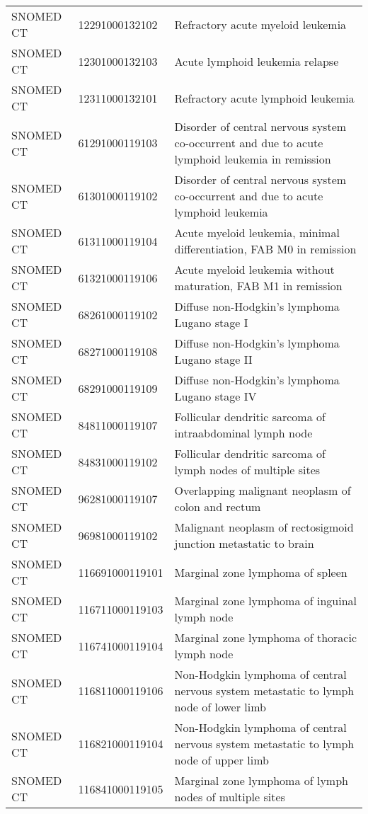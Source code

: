 \begin{longtable}{p{}p{}p{}}
  SNOMED CT & 12291000132102 & Refractory acute myeloid leukemia \\ 
  SNOMED CT & 12301000132103 & Acute lymphoid leukemia relapse \\ 
  SNOMED CT & 12311000132101 & Refractory acute lymphoid leukemia \\ 
  SNOMED CT & 61291000119103 & Disorder of central nervous system co-occurrent and due to acute lymphoid leukemia in remission \\ 
  SNOMED CT & 61301000119102 & Disorder of central nervous system co-occurrent and due to acute lymphoid leukemia \\ 
  SNOMED CT & 61311000119104 & Acute myeloid leukemia, minimal differentiation, FAB M0 in remission \\ 
  SNOMED CT & 61321000119106 & Acute myeloid leukemia without maturation, FAB M1 in remission \\ 
  SNOMED CT & 68261000119102 & Diffuse non-Hodgkin's lymphoma Lugano stage I \\ 
  SNOMED CT & 68271000119108 & Diffuse non-Hodgkin's lymphoma Lugano stage II \\ 
  SNOMED CT & 68291000119109 & Diffuse non-Hodgkin's lymphoma Lugano stage IV \\ 
  SNOMED CT & 84811000119107 & Follicular dendritic sarcoma of intraabdominal lymph node \\ 
  SNOMED CT & 84831000119102 & Follicular dendritic sarcoma of lymph nodes of multiple sites \\ 
  SNOMED CT & 96281000119107 & Overlapping malignant neoplasm of colon and rectum \\ 
  SNOMED CT & 96981000119102 & Malignant neoplasm of rectosigmoid junction metastatic to brain \\ 
  SNOMED CT & 116691000119101 & Marginal zone lymphoma of spleen \\ 
  SNOMED CT & 116711000119103 & Marginal zone lymphoma of inguinal lymph node \\ 
  SNOMED CT & 116741000119104 & Marginal zone lymphoma of thoracic lymph node \\ 
  SNOMED CT & 116811000119106 & Non-Hodgkin lymphoma of central nervous system metastatic to lymph node of lower limb \\ 
  SNOMED CT & 116821000119104 & Non-Hodgkin lymphoma of central nervous system metastatic to lymph node of upper limb \\ 
  SNOMED CT & 116841000119105 & Marginal zone lymphoma of lymph nodes of multiple sites \\ 

\end{longtable}
